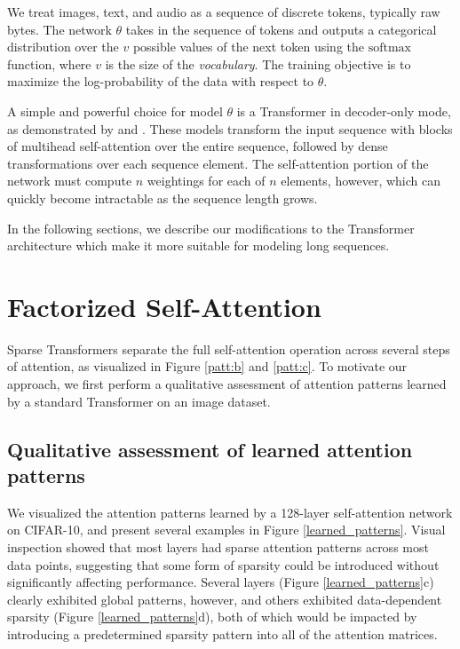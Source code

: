 \documentclass{article}
\begin{document}
We treat images, text, and audio as a sequence of discrete tokens, typically raw bytes. The network $\theta$ takes in the sequence of tokens and outputs a categorical distribution over the $v$ possible values of the next token using the $\mathrm{softmax}$ function, where $v$ is the size of the \textit{vocabulary}. The training objective is to maximize the log-probability of the data with respect to $\theta$.

A simple and powerful choice for model $\theta$ is a Transformer \cite{vaswani2017attention} in decoder-only mode, as demonstrated by \cite{radford2018} and \cite{liu2018generating}. These models transform the input sequence with blocks of multihead self-attention over the entire sequence, followed by dense transformations over each sequence element. The self-attention portion of the network must compute $n$ weightings for each of $n$ elements, however, which can quickly become intractable as the sequence length grows.

In the following sections, we describe our modifications to the Transformer architecture which make it more suitable for modeling long sequences.

\section{Factorized Self-Attention}



Sparse Transformers separate the full self-attention operation across several steps of attention, as visualized in Figure \ref{patt:b} and \ref{patt:c}. To motivate our approach, we first perform a qualitative assessment of attention patterns learned by a standard Transformer on an image dataset.


\subsection{Qualitative assessment of learned attention patterns}
We visualized the attention patterns learned by a 128-layer self-attention network on CIFAR-10, and present several examples in Figure \ref{learned_patterns}. Visual inspection showed that most layers had sparse attention patterns across most data points, suggesting that some form of sparsity could be introduced without significantly affecting performance. Several layers (Figure \ref{learned_patterns}c) clearly exhibited global patterns, however, and others exhibited data-dependent sparsity (Figure \ref{learned_patterns}d), both of which would be impacted by introducing a predetermined sparsity pattern into all of the attention matrices.
\end{document}
